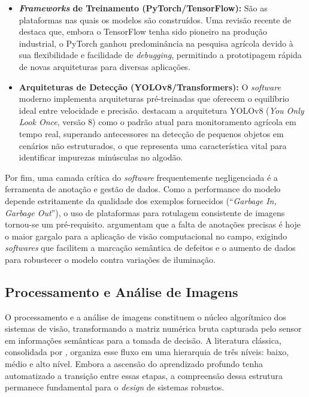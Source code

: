         \begin{itemize}
            \item \textbf{\textit{Frameworks} de Treinamento (PyTorch/TensorFlow):} São as plataformas nas quais os modelos são construídos. Uma revisão recente de  destaca que, embora o TensorFlow tenha sido pioneiro na produção industrial, o PyTorch ganhou predominância na pesquisa agrícola devido à sua flexibilidade e facilidade de \textit{debugging}, permitindo a prototipagem rápida de novas arquiteturas para diversas aplicações.
            
            \item \textbf{Arquiteturas de Detecção (YOLOv8/Transformers):} O \textit{software} moderno implementa arquiteturas pré-treinadas que oferecem o equilíbrio ideal entre velocidade e precisão.  destacam a arquitetura YOLOv8 (\textit{You Only Look Once}, versão 8) como o padrão atual para monitoramento agrícola em tempo real, superando antecessores na detecção de pequenos objetos em cenários não estruturados, o que representa uma característica vital para identificar impurezas minúsculas no algodão.
        \end{itemize}

        Por fim, uma camada crítica do \textit{software} frequentemente negligenciada é a ferramenta de anotação e gestão de dados. Como a performance do modelo depende estritamente da qualidade dos exemplos fornecidos (``\textit{Garbage In, Garbage Out}''), o uso de plataformas para rotulagem consistente de imagens tornou-se um pré-requisito.  argumentam que a falta de anotações precisas é hoje o maior gargalo para a aplicação de visão computacional no campo, exigindo \textit{softwares} que facilitem a marcação semântica de defeitos e o aumento de dados para robustecer o modelo contra variações de iluminação.

\subsection{Processamento e Análise de Imagens}

    O processamento e a análise de imagens constituem o núcleo algorítmico dos sistemas de visão, transformando a matriz numérica bruta capturada pelo sensor em informações semânticas para a tomada de decisão. A literatura clássica, consolidada por , organiza esse fluxo em uma hierarquia de três níveis: baixo, médio e alto nível. Embora a ascensão do aprendizado profundo tenha automatizado a transição entre essas etapas, a compreensão dessa estrutura permanece fundamental para o \textit{design} de sistemas robustos.


